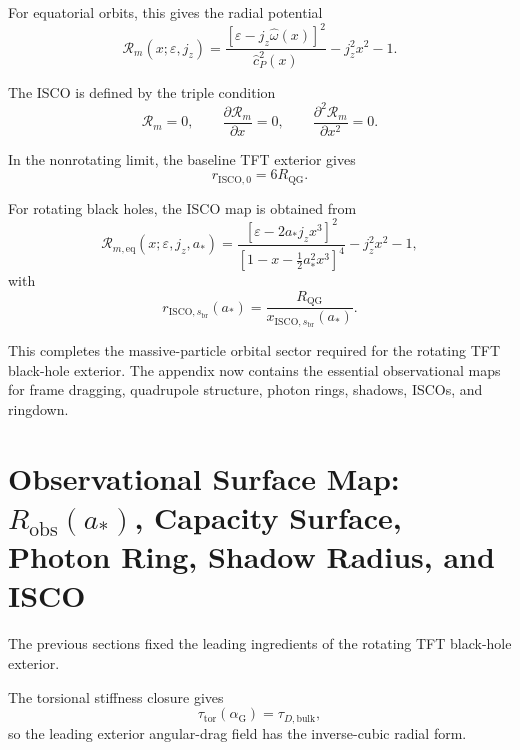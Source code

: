For equatorial orbits, this gives the radial potential
\begin{equation}
    \boxed{ \mathcal{R}_m(x;\varepsilon,j_z) = \frac{ \left[ \varepsilon - j_z\widehat{\omega}(x) \right]^2 }{ \widehat{c}_P^2(x) } - j_z^2x^2 - 1. }
\end{equation}

The ISCO is defined by the triple condition
\begin{equation}
    \boxed{ \mathcal{R}_m = 0, \qquad \frac{\partial\mathcal{R}_m}{\partial x} = 0, \qquad \frac{\partial^2\mathcal{R}_m}{\partial x^2} = 0. }
\end{equation}

In the nonrotating limit, the baseline TFT exterior gives
\begin{equation}
    \boxed{ r_{\mathrm{ISCO},0} = 6R_{\mathrm{QG}}. }
\end{equation}

For rotating black holes, the ISCO map is obtained from
\begin{equation}
    \boxed{ \mathcal{R}_{m,\mathrm{eq}}(x;\varepsilon,j_z,a_\ast) = \frac{ \left[ \varepsilon - 2a_\ast j_z x^3 \right]^2 }{ \left[ 1 - x - \frac{1}{2}a_\ast^2x^3 \right]^4 } - j_z^2x^2 - 1, }
\end{equation}
with
\begin{equation}
    \boxed{ r_{\mathrm{ISCO},s_{\mathrm{br}}}(a_\ast) = \frac{R_{\mathrm{QG}}}{x_{\mathrm{ISCO},s_{\mathrm{br}}}(a_\ast)}. }
\end{equation}

This completes the massive-particle orbital sector required for the rotating TFT black-hole exterior. The appendix now contains the essential observational maps for frame dragging, quadrupole structure, photon rings, shadows, ISCOs, and ringdown.

\section{Observational Surface Map: $R_{\mathrm{obs}}(a_\ast)$, Capacity Surface, Photon Ring, Shadow Radius, and ISCO}

The previous sections fixed the leading ingredients of the rotating TFT black-hole exterior.

The torsional stiffness closure gives
\begin{equation}
    \tau_{\mathrm{tor}}(\alpha_{\mathrm{G}}) = \tau_{D,\mathrm{bulk}},
\end{equation}
so the leading exterior angular-drag field has the inverse-cubic radial form.

